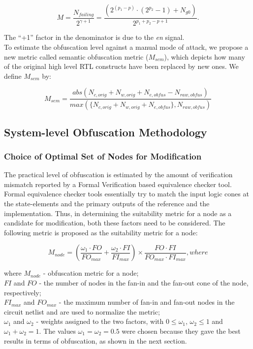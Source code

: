 \documentclass{optica-article}
\begin{document}
\begin{equation}
    \label{equation:3}
    M=\frac{N_{failing}}{2^{\gamma+1}} =\frac{(2^{(p_1- p)}\cdot(2^{p_2} - 1)+N_{g0})}{2^{p_1+p_2-p+1}}.
\end{equation}

\indent The “+1” factor in the denominator is due to the \textit{en} signal.\\
\indent To estimate the obfuscation level against a manual mode of attack, we propose a new metric called semantic obfuscation metric ($M_{sem}$), which depicts how many of the original high level RTL constructs have been replaced by new ones. We define $M_{sem}$ by:

\begin{equation} %
    \label{equation:4}
    M_{sem}=\frac{abs(N_{c,orig}+N_{w,orig}+N_{e,obfus}-N_{raw,obfus})}{max(\{N_{c,orig}+N_{w,orig}+N_{e,obfus}\},N_{raw,obfus})}
\end{equation}


\subsection{System-level Obfuscation Methodology}

\subsubsection{Choice of Optimal Set of Nodes for Modification}

The practical level of obfuscation is estimated by the amount of verification mismatch reported by a Formal Verification based equivalence checker tool. Formal equivalence checker tools essentially try to match the input logic cones at the state-elements and the primary outputs of the reference and the implementation. Thus, in determining the suitability metric for a node as a candidate for modification, both these factors need to be considered. The following metric is proposed as the suitability metric for a node:

\begin{equation} %
    M_{node}=\left(\frac{\omega_1\cdot FO}{FO_{max}}+\frac{\omega_2\cdot FI}{FI_{max}}\right)\times\frac{FO\cdot FI}{FO_{max}\cdot FI_{max}},
    where
\end{equation}

where $M_{node}$ - obfuscation metric for a node;\\
$FI$ and $FO$ - the number of nodes in the fan-in and the fan-out cone of the node, respectively;\\
$FI_{max}$ and $FO_{max}$ - the maximum number of fan-in and fan-out nodes in the circuit netlist and are used to normalize the metric;\\
$\omega_1$ and $\omega_2$ - weights assigned to the two factors, with $0\leq\omega_1$, $\omega_2\leq1$ and $\omega_1 + \omega_2 = 1$. The values $\omega_1 = \omega_2 = 0.5$ were chosen because they gave the best results in terms of obfuscation, as shown in the next section.
\end{document}

